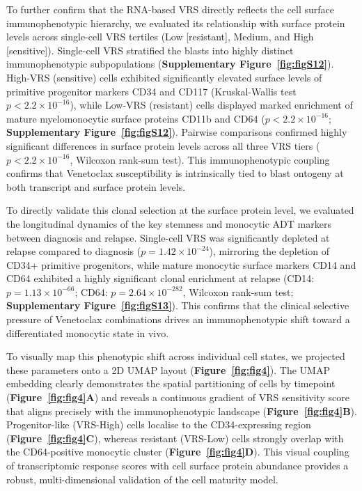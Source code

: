 \documentclass[11pt,a4paper]{article}
\begin{document}
To further confirm that the RNA-based VRS directly reflects the cell surface immunophenotypic hierarchy, we evaluated its relationship with surface protein levels across single-cell VRS tertiles (Low [resistant], Medium, and High [sensitive]). Single-cell VRS stratified the blasts into highly distinct immunophenotypic subpopulations (\textbf{Supplementary Figure~\ref{fig:figS12}}). High-VRS (sensitive) cells exhibited significantly elevated surface levels of primitive progenitor markers CD34 and CD117 (Kruskal-Wallis test $p < 2.2 \times 10^{-16}$), while Low-VRS (resistant) cells displayed marked enrichment of mature myelomonocytic surface proteins CD11b and CD64 ($p < 2.2 \times 10^{-16}$; \textbf{Supplementary Figure~\ref{fig:figS12}}). Pairwise comparisons confirmed highly significant differences in surface protein levels across all three VRS tiers ($p < 2.2 \times 10^{-16}$, Wilcoxon rank-sum test). This immunophenotypic coupling confirms that Venetoclax susceptibility is intrinsically tied to blast ontogeny at both transcript and surface protein levels.

To directly validate this clonal selection at the surface protein level, we evaluated the longitudinal dynamics of the key stemness and monocytic ADT markers between diagnosis and relapse. Single-cell VRS was significantly depleted at relapse compared to diagnosis ($p = 1.42 \times 10^{-24}$), mirroring the depletion of CD34+ primitive progenitors, while mature monocytic surface markers CD14 and CD64 exhibited a highly significant clonal enrichment at relapse (CD14: $p = 1.13 \times 10^{-66}$; CD64: $p = 2.64 \times 10^{-282}$, Wilcoxon rank-sum test; \textbf{Supplementary Figure~\ref{fig:figS13}}). This confirms that the clinical selective pressure of Venetoclax combinations drives an immunophenotypic shift toward a differentiated monocytic state in vivo.

To visually map this phenotypic shift across individual cell states, we projected these parameters onto a 2D UMAP layout (\textbf{Figure~\ref{fig:fig4}}). The UMAP embedding clearly demonstrates the spatial partitioning of cells by timepoint (\textbf{Figure~\ref{fig:fig4}A}) and reveals a continuous gradient of VRS sensitivity score that aligns precisely with the immunophenotypic landscape (\textbf{Figure~\ref{fig:fig4}B}). Progenitor-like (VRS-High) cells localise to the CD34-expressing region (\textbf{Figure~\ref{fig:fig4}C}), whereas resistant (VRS-Low) cells strongly overlap with the CD64-positive monocytic cluster (\textbf{Figure~\ref{fig:fig4}D}). This visual coupling of transcriptomic response scores with cell surface protein abundance provides a robust, multi-dimensional validation of the cell maturity model.
\end{document}
